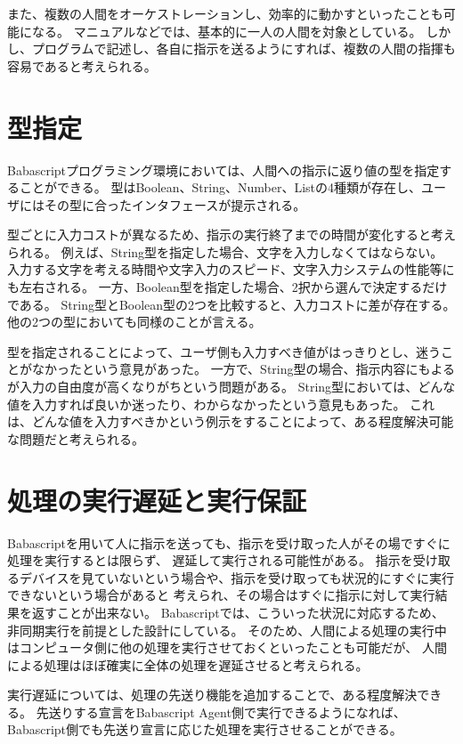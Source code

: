 また、複数の人間をオーケストレーションし、効率的に動かすといったことも可能になる。
マニュアルなどでは、基本的に一人の人間を対象としている。
しかし、プログラムで記述し、各自に指示を送るようにすれば、複数の人間の指揮も容易であると考えられる。

\section{型指定}\label{ux578bux6307ux5b9a}

Babascriptプログラミング環境においては、人間への指示に返り値の型を指定することができる。
型はBoolean、String、Number、Listの4種類が存在し、ユーザにはその型に合ったインタフェースが提示される。

型ごとに入力コストが異なるため、指示の実行終了までの時間が変化すると考えられる。
例えば、String型を指定した場合、文字を入力しなくてはならない。
入力する文字を考える時間や文字入力のスピード、文字入力システムの性能等にも左右される。
一方、Boolean型を指定した場合、2択から選んで決定するだけである。
String型とBoolean型の2つを比較すると、入力コストに差が存在する。
他の2つの型においても同様のことが言える。

型を指定されることによって、ユーザ側も入力すべき値がはっきりとし、迷うことがなかったという意見があった。
一方で、String型の場合、指示内容にもよるが入力の自由度が高くなりがちという問題がある。
String型においては、どんな値を入力すれば良いか迷ったり、わからなかったという意見もあった。
これは、どんな値を入力すべきかという例示をすることによって、ある程度解決可能な問題だと考えられる。

\section{処理の実行遅延と実行保証}\label{ux51e6ux7406ux306eux5b9fux884cux9045ux5ef6ux3068ux5b9fux884cux4fddux8a3c}

Babascriptを用いて人に指示を送っても、指示を受け取った人がその場ですぐに処理を実行するとは限らず、
遅延して実行される可能性がある。
指示を受け取るデバイスを見ていないという場合や、指示を受け取っても状況的にすぐに実行できないという場合があると
考えられ、その場合はすぐに指示に対して実行結果を返すことが出来ない。
Babascriptでは、こういった状況に対応するため、非同期実行を前提とした設計にしている。
そのため、人間による処理の実行中はコンピュータ側に他の処理を実行させておくといったことも可能だが、
人間による処理はほぼ確実に全体の処理を遅延させると考えられる。

実行遅延については、処理の先送り機能を追加することで、ある程度解決できる。
先送りする宣言をBabascript Agent側で実行できるようになれば、
Babascript側でも先送り宣言に応じた処理を実行させることができる。


